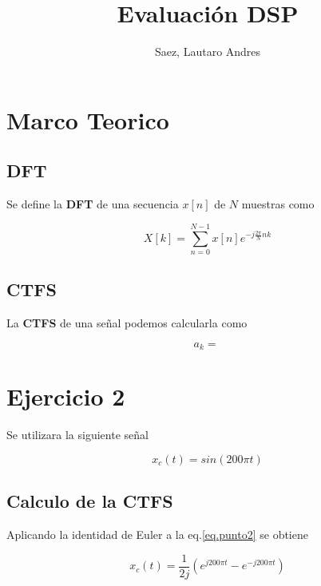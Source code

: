 \documentclass[letterpaper]{article}
\title{Evaluación DSP}
\author{Saez, Lautaro Andres}
\begin{document}
    \maketitle

    \section{Marco Teorico}

    \subsection{DFT}

    Se define la \textbf{DFT} de una secuencia $x[n]$ de $N$ muestras como

    \begin{equation}
        \label{eq.DFT}
        X[k]=\sum_{n=0}^{N-1} x[n]e^{-j\frac{2\pi }{N} nk }
    \end{equation}

    \subsection{CTFS}

    La \textbf{CTFS} de una señal podemos calcularla como 

    \begin{equation}
        a_k = \
    \end{equation}

    \section*{Ejercicio 2}

    Se utilizara la siguiente señal 

    \begin{equation}
        \label{eq.punto2}
        x_c(t) = sin( 200 \pi t )
    \end{equation}

    \subsection*{Calculo de la CTFS}

    Aplicando la identidad de Euler a la eq.\ref{eq.punto2} se obtiene 

    \begin{equation}
        x_c(t)=\frac{1}{2j}( e^{j200\pi t} - e^{-j200 \pi t})
    \end{equation}
\end{document}
